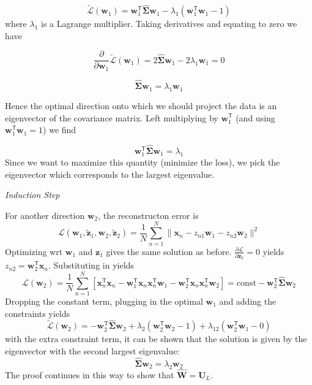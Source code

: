 \documentclass[11pt]{article}
\begin{document}
\[
\tilde{\mathcal{L}}(\boldsymbol{w}_1) = \boldsymbol{w}_1^\mathsf{T}\hat{\boldsymbol{\Sigma}}\boldsymbol{w}_1 - \lambda_1(\boldsymbol{w}_1^\mathsf{T}\boldsymbol{w}_1 - 1)
\]
where $\lambda_1$ is a Lagrange multiplier. Taking derivatives and equating to zero we have

\[
\frac{\partial}{\partial \boldsymbol{w}_1} \tilde{\mathcal{L}}(\boldsymbol{w}_1) = 2\hat{\boldsymbol{\Sigma}}\boldsymbol{w}_1 - 2\lambda_1 \boldsymbol{w}_1 = 0
\]

\[
\hat{\boldsymbol{\Sigma}}\boldsymbol{w}_1 = \lambda_1 \boldsymbol{w}_1
\]

Hence the optimal direction onto which we should project the data is an eigenvector of the covariance matrix. Left multiplying by $\boldsymbol{w}_1^\mathsf{T}$ (and using $\boldsymbol{w}_1^\mathsf{T}\boldsymbol{w}_1 = 1$) we find

\[
\boldsymbol{w}_1^\mathsf{T}\hat{\boldsymbol{\Sigma}}\boldsymbol{w}_1 = \lambda_1
\]
Since we want to maximize this quantity (minimize the loss), we pick the eigenvector which corresponds to the largest eigenvalue.

\par\medskip
\noindent \textit{Induction Step}

For another direction $\mathbf{w}_2$, the reconstructon error is
\[
\mathcal{L}(\boldsymbol{w}_1, \tilde{\boldsymbol{z}}_1, \boldsymbol{w}_2, \tilde{\boldsymbol{z}}_2) = \frac{1}{N} \sum_{n=1}^N \|\boldsymbol{x}_n - z_{n1}\boldsymbol{w}_1 - z_{n2}\boldsymbol{w}_2\|^2
\]
Optimizing wrt $\boldsymbol{w}_1$ and $\boldsymbol{z}_1$ gives the same solution as before. $\frac{\partial \mathcal{L}}{\partial \boldsymbol{z}_2} = 0$ yields $z_{n2} = \boldsymbol{w}_2^\mathsf{T}\boldsymbol{x}_n$. Substituting in yields
\[
\mathcal{L}(\boldsymbol{w}_2) = \frac{1}{N} \sum_{n=1}^N [\boldsymbol{x}_n^\mathsf{T}\boldsymbol{x}_n - \boldsymbol{w}_1^\mathsf{T}\boldsymbol{x}_n\boldsymbol{x}_n^\mathsf{T}\boldsymbol{w}_1 - \boldsymbol{w}_2^\mathsf{T}\boldsymbol{x}_n\boldsymbol{x}_n^\mathsf{T}\boldsymbol{w}_2] = \text{const} - \boldsymbol{w}_2^\mathsf{T}\hat{\boldsymbol{\Sigma}}\boldsymbol{w}_2
\]
Dropping the constant term, plugging in the optimal $\boldsymbol{w}_1$ and adding the constraints yields
\[
\tilde{\mathcal{L}}(\boldsymbol{w}_2) = -\boldsymbol{w}_2^\mathsf{T}\hat{\boldsymbol{\Sigma}}\boldsymbol{w}_2 + \lambda_2(\boldsymbol{w}_2^\mathsf{T}\boldsymbol{w}_2 - 1) + \lambda_{12}(\boldsymbol{w}_2^\mathsf{T}\boldsymbol{w}_1 - 0)
\]
with the extra constraint term, it can be shown that the solution is given by the eigenvector with the second largest eigenvalue:
\[
\hat{\boldsymbol{\Sigma}}\boldsymbol{w}_2 = \lambda_2 \boldsymbol{w}_2
\]
The proof continues in this way to show that $\hat{\mathbf{W}} = \mathbf{U}_L$.
\end{document}
